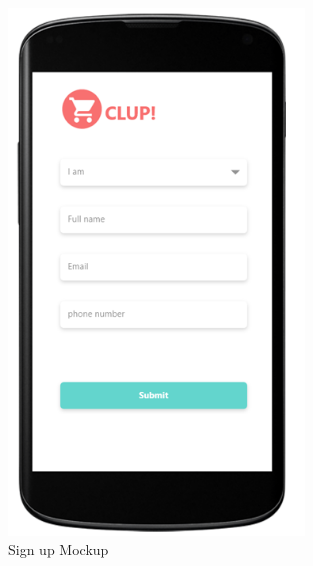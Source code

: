 \begin{figure}[H]
  \centering
  \includegraphics[width=0.7\textwidth,keepaspectratio]{images/7.png}
  \caption{Sign up Mockup}
\end{figure}
